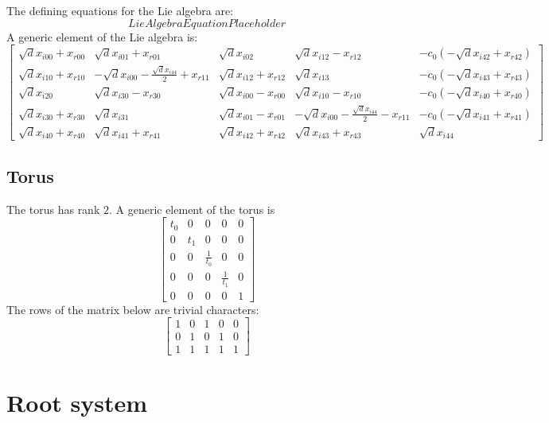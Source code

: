 \documentclass[11pt]{article}
\theoremstyle{definition}
\begin{document}
The defining equations for the Lie algebra are:
\[
LieAlgebraEquationPlaceholder
\]
A generic element of the Lie algebra is:
\[
\left[\begin{matrix}\sqrt{d} x_{i 0 0} + x_{r 0 0} & \sqrt{d} x_{i 0 1} + x_{r 0 1} & \sqrt{d} x_{i 0 2} & \sqrt{d} x_{i 1 2} - x_{r 1 2} & - c_{0} \left(- \sqrt{d} x_{i 4 2} + x_{r 4 2}\right)\\\sqrt{d} x_{i 1 0} + x_{r 1 0} & - \sqrt{d} x_{i 0 0} - \frac{\sqrt{d} x_{i 4 4}}{2} + x_{r 1 1} & \sqrt{d} x_{i 1 2} + x_{r 1 2} & \sqrt{d} x_{i 1 3} & - c_{0} \left(- \sqrt{d} x_{i 4 3} + x_{r 4 3}\right)\\\sqrt{d} x_{i 2 0} & \sqrt{d} x_{i 3 0} - x_{r 3 0} & \sqrt{d} x_{i 0 0} - x_{r 0 0} & \sqrt{d} x_{i 1 0} - x_{r 1 0} & - c_{0} \left(- \sqrt{d} x_{i 4 0} + x_{r 4 0}\right)\\\sqrt{d} x_{i 3 0} + x_{r 3 0} & \sqrt{d} x_{i 3 1} & \sqrt{d} x_{i 0 1} - x_{r 0 1} & - \sqrt{d} x_{i 0 0} - \frac{\sqrt{d} x_{i 4 4}}{2} - x_{r 1 1} & - c_{0} \left(- \sqrt{d} x_{i 4 1} + x_{r 4 1}\right)\\\sqrt{d} x_{i 4 0} + x_{r 4 0} & \sqrt{d} x_{i 4 1} + x_{r 4 1} & \sqrt{d} x_{i 4 2} + x_{r 4 2} & \sqrt{d} x_{i 4 3} + x_{r 4 3} & \sqrt{d} x_{i 4 4}\end{matrix}\right]
\]

\subsection{Torus}

The torus has rank $2$. A generic element of the torus is
\[
\left[\begin{matrix}t_{0} & 0 & 0 & 0 & 0\\0 & t_{1} & 0 & 0 & 0\\0 & 0 & \frac{1}{t_{0}} & 0 & 0\\0 & 0 & 0 & \frac{1}{t_{1}} & 0\\0 & 0 & 0 & 0 & 1\end{matrix}\right]
\]
The rows of the matrix below are trivial characters:
\[
\left[\begin{matrix}1 & 0 & 1 & 0 & 0\\0 & 1 & 0 & 1 & 0\\1 & 1 & 1 & 1 & 1\end{matrix}\right]
\]

\newpage
\section{Root system}
\end{document}
